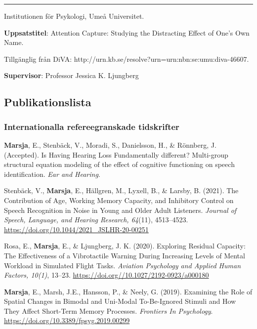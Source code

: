 \documentclass[]{article}
\begin{document}
\hrule

\begin{changemargin}{2.3cm}{2.4cm}

Institutionen för Psykologi, Umeå Universitet.

\textbf{Uppsatstitel}:  Attention Capture: Studying the Distracting Effect of One’s Own Name.

Tillgänglig från DiVA: \sloppy http://urn.kb.se/resolve?urn=urn:nbn:se:umu:diva-46607.
    
\textbf{Supervisor}: Professor Jessica K. Ljungberg
\end{changemargin}

\hypertarget{publikationslista}{%
\subsection{Publikationslista}\label{publikationslista}}

\hypertarget{internationalla-refereegranskade-tidskrifter}{%
\subsubsection{Internationalla refereegranskade
tidskrifter}\label{internationalla-refereegranskade-tidskrifter}}

\textbf{Marsja}, E., Stenbäck, V., Moradi, S., Danielsson, H., \&
Rönnberg, J. (Accepted). Is Having Hearing Loss Fundamentally different?
Multi-group structural equation modeling of the effect of cognitive
functioning on speech identification. \emph{Ear and Hearing}.

Stenbäck, V., \textbf{Marsja}, E., Hällgren, M., Lyxell, B., \& Larsby,
B. (2021). The Contribution of Age, Working Memory Capacity, and
Inhibitory Control on Speech Recognition in Noise in Young and Older
Adult Listeners. \emph{Journal of Speech, Language, and Hearing
Research, 64}(11), 4513--4523.
\url{https://doi.org/10.1044/2021_JSLHR-20-00251}

Rosa, E., \textbf{Marsja}, E., \& Ljungberg, J. K. (2020). Exploring
Residual Capacity: The Effectiveness of a Vibrotactile Warning During
Increasing Levels of Mental Workload in Simulated Flight Tasks.
\emph{Aviation Psychology and Applied Human Factors, 10(1)}, 13--23.
\url{https://doi.org//10.1027/2192-0923/a000180}

\textbf{Marsja}, E., Marsh, J.E., Hansson, P., \& Neely, G. (2019).
Examining the Role of Spatial Changes in Bimodal and Uni-Modal
To-Be-Ignored Stimuli and How They Affect Short-Term Memory Processes.
\emph{Frontiers In Psychology}.
\url{https://doi.org/10.3389/fpsyg.2019.00299}
\end{document}
